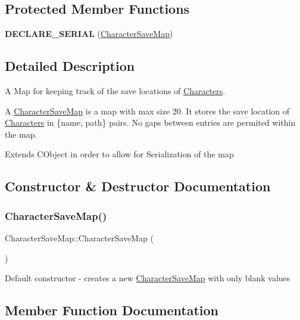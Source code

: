 \subsection*{Protected Member Functions}
\begin{DoxyCompactItemize}
\item 
\hypertarget{class_character_save_map_ae2e1fdded520c188c335b8f1d7c65d71}{}\label{class_character_save_map_ae2e1fdded520c188c335b8f1d7c65d71} 
{\bfseries D\+E\+C\+L\+A\+R\+E\+\_\+\+S\+E\+R\+I\+AL} (\hyperlink{class_character_save_map}{Character\+Save\+Map})
\end{DoxyCompactItemize}


\subsection{Detailed Description}
A Map for keeping track of the save locations of \hyperlink{class_characters}{Characters}. 

A \hyperlink{class_character_save_map}{Character\+Save\+Map} is a map with max size 20. It stores the save location of \hyperlink{class_characters}{Characters} in \{name, path\} pairs. No gaps between entries are permited within the map. 

Extends C\+Object in order to allow for Serialization of the map 

\subsection{Constructor \& Destructor Documentation}
\hypertarget{class_character_save_map_a1628139ff98a52d2341b6505d5bae1b0}{}\label{class_character_save_map_a1628139ff98a52d2341b6505d5bae1b0} 
\subsubsection{\texorpdfstring{Character\+Save\+Map()}{CharacterSaveMap()}}
{\footnotesize\ttfamily Character\+Save\+Map\+::\+Character\+Save\+Map (\begin{DoxyParamCaption}{ }\end{DoxyParamCaption})}

Default constructor -\/ creates a new \hyperlink{class_character_save_map}{Character\+Save\+Map} with only blank values 

\subsection{Member Function Documentation}
\hypertarget{class_character_save_map_ab139cd8a2bfb27da4a557689f32715b5}{}\label{class_character_save_map_ab139cd8a2bfb27da4a557689f32715b5} 
